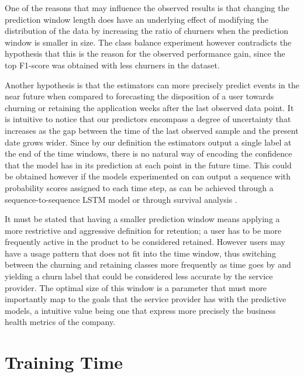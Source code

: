 \documentclass{kththesis}
\begin{document}
One of the reasons that may influence the observed results is that changing the prediction window length does have an underlying effect of modifying the distribution of the data by increasing the ratio of churners when the prediction window is smaller in size. The class balance experiment however contradicts the hypothesis that this is the reason for the observed performance gain, since the top F1-score was obtained with less churners in the dataset.

Another hypothesis is that the estimators can more precisely predict events in the near future when compared to forecasting the disposition of a user towards churning or retaining the application weeks after the last observed data point. It is intuitive to notice that our predictors encompass a degree of uncertainty that increases as the gap between the time of the last observed sample and the present date grows wider. Since by our definition the estimators output a single label at the end of the time windows, there is no natural way of encoding the confidence that the model has in its prediction at each point in the future time. This could be obtained however if the models experimented on can output a sequence with probability scores assigned to each time step, as can be achieved through a sequence-to-sequence LSTM \citep{cho2014learning} model or through survival analysis \citep{ibrahim2005bayesian}.

It must be stated that having a smaller prediction window means applying a more restrictive and aggressive definition for retention; a user has to be more frequently active in the product to be considered retained. However users may have a usage pattern that does not fit into the time window, thus switching between the churning and retaining classes more frequently as time goes by and yielding a churn label that could be considered less accurate by the service provider. The optimal size of this window is a parameter that must more importantly map to the goals that the service provider has with the predictive models, a intuitive value being one that express more precisely the business health metrics of the company.

\section{Training Time}
\end{document}
